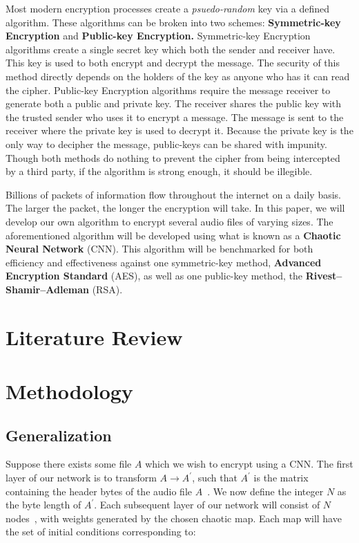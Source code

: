 \documentclass[conference]{IEEEtran}
\begin{document}
Most modern encryption processes create a \textit{psuedo-random} key via a defined algorithm.
These algorithms can be broken into two schemes: \textbf{Symmetric-key Encryption} and \textbf{Public-key Encryption.}
Symmetric-key Encryption algorithms create a single secret key which both the sender and receiver have.
This key is used to both encrypt and decrypt the message.
The security of this method directly depends on the holders of the key as anyone who has it can read the cipher.
Public-key Encryption algorithms require the message receiver to generate both a public and private key.
The receiver shares the public key with the trusted sender who uses it to encrypt a message.
The message is sent to the receiver where the private key is used to decrypt it.
Because the private key is the only way to decipher the message, public-keys can be shared with impunity.
Though both methods do nothing to prevent the cipher from being intercepted by a third party, if the algorithm is strong enough, it should be illegible.

Billions of packets of information flow throughout the internet on a daily basis.
The larger the packet, the longer the encryption will take.
In this paper, we will develop our own algorithm to encrypt several audio files of varying sizes.
The aforementioned algorithm will be developed using what is known as a \textbf{Chaotic Neural Network} (CNN).
This algorithm will be benchmarked for both efficiency and effectiveness against one symmetric-key method, \textbf{Advanced Encryption Standard} (AES), as well as one public-key method, the \textbf{Rivest–Shamir–Adleman} (RSA).

\section{Literature Review}\label{sec:literature-review}


\section{Methodology}\label{sec:methodology}

\subsection{Generalization}\label{subsec:generalization}

Suppose there exists some file $A$ which we wish to encrypt using a CNN\@.
The first layer of our network is to transform $A \rightarrow A^\prime$, such that $A^\prime$ is the matrix containing the header bytes of the audio file $A$~\cite{app112110190}.
We now define the integer $N$ as the byte length of $A^\prime$.
Each subsequent layer of our network will consist of $N$ nodes~\cite{Ahmad2016}, with weights generated by the chosen chaotic map.
Each map will have the set of initial conditions corresponding to:
\end{document}
